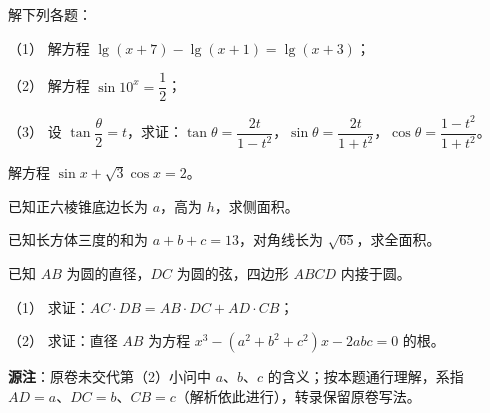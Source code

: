 

\begin{question}
解下列各题：

（1） 解方程 $\lg(x+7)-\lg(x+1)=\lg(x+3)$；

（2） 解方程 $\sin 10^{x}=\dfrac{1}{2}$；

（3） 设 $\tan\dfrac{\theta}{2}=t$，求证：$\tan\theta=\dfrac{2t}{1-t^{2}}$，$\sin\theta=\dfrac{2t}{1+t^{2}}$，$\cos\theta=\dfrac{1-t^{2}}{1+t^{2}}$。

\end{question}
\begin{question}
解方程 $\sin x+\sqrt{3}\cos x=2$。

\end{question}
\begin{question}
已知正六棱锥底边长为 $a$，高为 $h$，求侧面积。

\end{question}
\begin{question}
已知长方体三度的和为 $a+b+c=13$，对角线长为 $\sqrt{65}$，求全面积。

\Needspace{0.4\textheight}
\end{question}
\begin{question}
已知 $AB$ 为圆的直径，$DC$ 为圆的弦，四边形 $ABCD$ 内接于圆。

（1） 求证：$AC\cdot DB=AB\cdot DC+AD\cdot CB$；

（2） 求证：直径 $AB$ 为方程 $x^{3}-(a^{2}+b^{2}+c^{2})x-2abc=0$ 的根。
\nopagebreak[4]
\begin{center}\end{center}
\nopagebreak[4]
\begin{gktip}
\textbf{源注}：原卷未交代第（2）小问中 $a$、$b$、$c$ 的含义；按本题通行理解，系指 $AD=a$、$DC=b$、$CB=c$（解析依此进行），转录保留原卷写法。
\end{gktip}

\end{question}